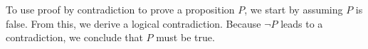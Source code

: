 To use proof by contradiction to prove a proposition $P$, we start by assuming $P$ is false.
From this, we derive a logical contradiction.
Because $\neg P$ leads to a contradiction, we conclude that $P$ must be true.
%
%
%
%

